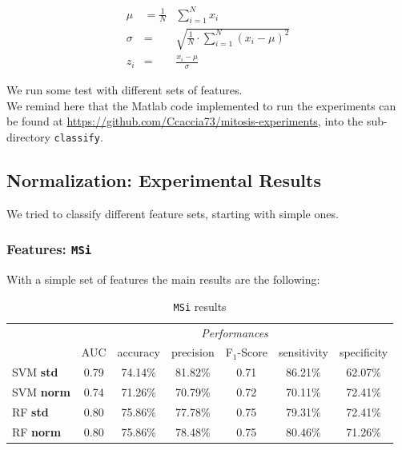 \begin{eqnarray}
 \mu & = \frac{1}{N} & \sum_{i=1}^{N} x_i \\
 \sigma & = & \sqrt{ \frac{1}{N} \cdot \sum_{i=1}^{N}(x_i - \mu)^2 } \\
 z_i & = & \frac{x_i - \mu}{\sigma}
\end{eqnarray}

\noindent We run some test with different sets of features.
\\
We remind here that the Matlab code implemented to run the experiments can be found at \url{https://github.com/Ccaccia73/mitosis-experiments}, into the sub-directory \texttt{classify}.

\vspace{0.5cm}

\subsection{Normalization: Experimental Results}

We tried to classify different feature sets, starting with simple ones.

\vspace{0.5cm}

\subsubsection{Features: \texttt{MSi}}

With a simple set of features the main results are the following:


\begin{table}[!hbt]
\small
 \centering
 \begin{tabular}{lcccccc}
  \toprule
  & \multicolumn{6}{c}{\textit{Performances}} \\
  \cmidrule(lr){2-7}
  & AUC  & accuracy & precision & F$_1$-Score & sensitivity & specificity \\
  \midrule
    SVM \textbf{std}   & 0.79 & 74.14\%  & 81.82\%   & 0.71        & 86.21\%     & 62.07\%  \\
    SVM \textbf{norm}  & 0.74 & 71.26\%  & 70.79\%   & 0.72        & 70.11\%     & 72.41\%  \\
    RF \textbf{std}    & 0.80 & 75.86\%  & 77.78\%   & 0.75        & 79.31\%     & 72.41\%  \\
    RF \textbf{norm}   & 0.80 & 75.86\%  & 78.48\%   & 0.75        & 80.46\%     & 71.26\%  \\
    \bottomrule
 \end{tabular}

 \caption{\texttt{MSi} results}
 \label{ch6:tab1}
\end{table}



